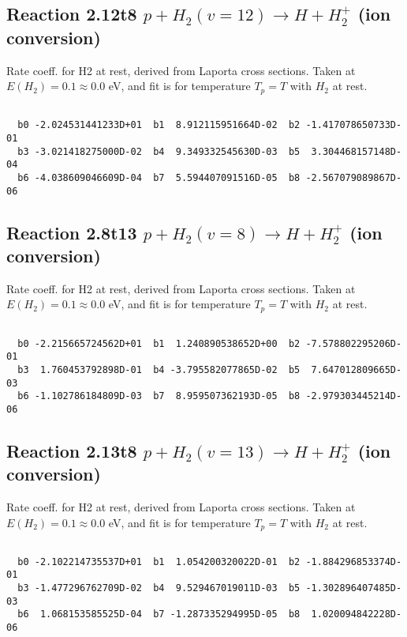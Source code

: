 \documentclass[12pt,dvipdfmx]{article}
\begin{document}
\newpage
\subsection{
Reaction 2.12t8
$ p + H_2(v=12) \rightarrow H + H_2^+$ (ion conversion)
}
Rate coeff. for H2 at rest, derived from Laporta cross sections.
Taken at $E(H_2) = 0.1 \approx 0.0$ eV,  and fit is for temperature $T_p=T$ with $H_2$ at rest.

\begin{small}\begin{verbatim}

  b0 -2.024531441233D+01  b1  8.912115951664D-02  b2 -1.417078650733D-01
  b3 -3.021418275000D-02  b4  9.349332545630D-03  b5  3.304468157148D-04
  b6 -4.038609046609D-04  b7  5.594407091516D-05  b8 -2.567079089867D-06

\end{verbatim}\end{small}

\newpage
\subsection{
Reaction 2.8t13
$ p + H_2(v=8) \rightarrow H + H_2^+$ (ion conversion)
}
Rate coeff. for H2 at rest, derived from Laporta cross sections.
Taken at $E(H_2) = 0.1 \approx 0.0$ eV,  and fit is for temperature $T_p=T$ with $H_2$ at rest.

\begin{small}\begin{verbatim}

  b0 -2.215665724562D+01  b1  1.240890538652D+00  b2 -7.578802295206D-01
  b3  1.760453792898D-01  b4 -3.795582077865D-02  b5  7.647012809665D-03
  b6 -1.102786184809D-03  b7  8.959507362193D-05  b8 -2.979303445214D-06

\end{verbatim}\end{small}

\newpage
\subsection{
Reaction 2.13t8
$ p + H_2(v=13) \rightarrow H + H_2^+$ (ion conversion)
}
Rate coeff. for H2 at rest, derived from Laporta cross sections.
Taken at $E(H_2) = 0.1 \approx 0.0$ eV,  and fit is for temperature $T_p=T$ with $H_2$ at rest.

\begin{small}\begin{verbatim}

  b0 -2.102214735537D+01  b1  1.054200320022D-01  b2 -1.884296853374D-01
  b3 -1.477296762709D-02  b4  9.529467019011D-03  b5 -1.302896407485D-03
  b6  1.068153585525D-04  b7 -1.287335294995D-05  b8  1.020094842228D-06

\end{verbatim}\end{small}
\end{document}
